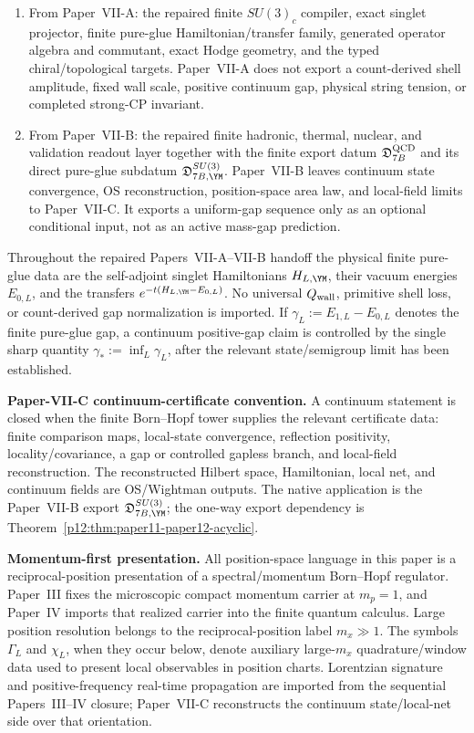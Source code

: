 \documentclass[12pt,a4paper]{article}
\begin{document}
\begin{enumerate}[label=(I\arabic*), leftmargin=2.8em]
\item From Paper~VII-A: the repaired finite \(SU(3)_c\) compiler, exact singlet projector, finite pure-glue Hamiltonian/transfer family, generated operator algebra and commutant, exact Hodge geometry, and the typed chiral/topological targets.  Paper~VII-A does not export a count-derived shell amplitude, fixed wall scale, positive continuum gap, physical string tension, or completed strong-CP invariant.

\item From Paper~VII-B: the repaired finite hadronic, thermal, nuclear, and validation readout layer together with the finite export datum \(\mathfrak D_{7B}^{\rm QCD}\) and its direct pure-glue subdatum \(\mathfrak D_{7B,\YM}^{SU(3)}\).  Paper~VII-B leaves continuum state convergence, OS reconstruction, position-space area law, and local-field limits to Paper~VII-C.  It exports a uniform-gap sequence only as an optional conditional input, not as an active mass-gap prediction.

\end{enumerate}

Throughout the repaired Papers~VII-A--VII-B handoff the physical finite pure-glue data are the self-adjoint singlet Hamiltonians \(H_{L,\YM}\), their vacuum energies \(E_{0,L}\), and the transfers \(e^{-t(H_{L,\YM}-E_{0,L})}\).  No universal \(Q_{\rm wall}\), primitive shell loss, or count-derived gap normalization is imported.  If \(\gamma_L:=E_{1,L}-E_{0,L}\) denotes the finite pure-glue gap, a continuum positive-gap claim is controlled by the single sharp quantity \(\gamma_*:=\inf_L\gamma_L\), after the relevant state/semigroup limit has been established.

\textbf{Paper-VII-C continuum-certificate convention.}
A continuum statement is closed when the finite Born--Hopf tower supplies the relevant certificate data: finite comparison maps, local-state convergence, reflection positivity, locality/covariance, a gap or controlled gapless branch, and local-field reconstruction.  The reconstructed Hilbert space, Hamiltonian, local net, and continuum fields are OS/Wightman outputs.  The native application is the Paper~VII-B export \(\mathfrak D_{7B,\YM}^{SU(3)}\); the one-way export dependency is Theorem~\ref{p12:thm:paper11-paper12-acyclic}.

\textbf{Momentum-first presentation.}
All position-space language in this paper is a reciprocal-position presentation of a spectral/momentum Born--Hopf regulator.  Paper~III fixes the microscopic compact momentum carrier at \(m_p=1\), and Paper~IV imports that realized carrier into the finite quantum calculus.  Large position resolution belongs to the reciprocal-position label \(m_x\gg1\).  The symbols \(\Gamma_L\) and \(\chi_L\), when they occur below, denote auxiliary large-\(m_x\) quadrature/window data used to present local observables in position charts.  Lorentzian signature and positive-frequency real-time propagation are imported from the sequential Papers~III--IV closure; Paper~VII-C reconstructs the continuum state/local-net side over that orientation.
\end{document}
